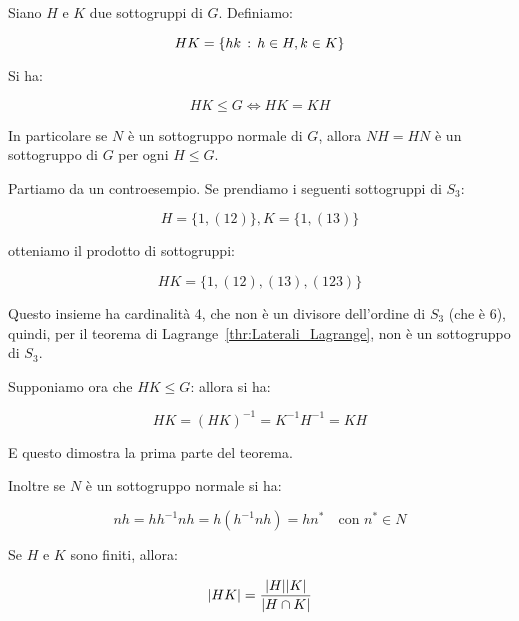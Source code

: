 \begin{teorema}
	\label{thr:prodotto_sottogruppi}
	Siano $H$ e $K$ due sottogruppi di $G$. Definiamo:
	
	\begin{equation}
		HK = \{hk \,:\, h \in H, k \in K\}
	\end{equation}

	Si ha:

	\begin{equation}
		HK \le G \Longleftrightarrow HK = KH
	\end{equation}

	In particolare se $N$ è un sottogruppo normale di $G$, allora $NH = HN$ è un sottogruppo di $G$ per ogni $H \le G$.

\end{teorema}
\begin{dimostrazione}
	Partiamo da un controesempio. Se prendiamo i seguenti sottogruppi di $S_3$:
	
	\begin{equation}
		H = \{1, (12)\}, K = \{1, (13)\}
	\end{equation}
	
	otteniamo il prodotto di sottogruppi:
	
	\begin{equation*}
		HK = \{1, (12), (13), (123)\}
	\end{equation*}
	
	Questo insieme ha cardinalità 4, che non è un divisore dell'ordine di $S_3$ (che è 6), quindi,
	per il  teorema di Lagrange~\ref{thr:Laterali_Lagrange}, non è un sottogruppo di $S_3$.
	
	Supponiamo ora che $HK \le G$: allora si ha:
	
	\begin{equation*}
		HK = (HK)^{-1} = K^{-1}H^{-1} = KH
	\end{equation*}
	
	E questo dimostra la prima parte del teorema.
	
	Inoltre se $N$ è un sottogruppo normale si ha:
	
	\begin{equation*}
		nh = hh^{-1}nh = h(h^{-1}nh) = hn^* \quad \text{con } n^* \in N
	\end{equation*}
\end{dimostrazione}

\begin{teorema}
	\label{thr:ordine_prodotto_sottogruppi}
	Se $H$ e $K$ sono finiti, allora:

	\begin{equation*}
		\lvert HK \rvert = \dfrac{\lvert H \rvert\lvert K \rvert}{\lvert H \cap K \rvert}
	\end{equation*}
\end{teorema}

